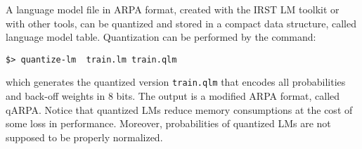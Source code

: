A language model file in ARPA  format, created with the IRST LM toolkit or
with other tools, can be quantized and stored in a compact data structure, 
called language model table.  Quantization can be performed by the command:

\begin{verbatim}
$> quantize-lm  train.lm train.qlm
\end{verbatim}

\noindent
which  generates   the  quantized  version  {\tt train.qlm} that  encodes all probabilities and back-off 
weights in 8 bits. The  output is a  modified ARPA format, called qARPA. Notice that quantized
LMs reduce memory consumptions at the cost of some loss in performance. Moreover, probabilities
of quantized LMs are not supposed to be properly normalized.

